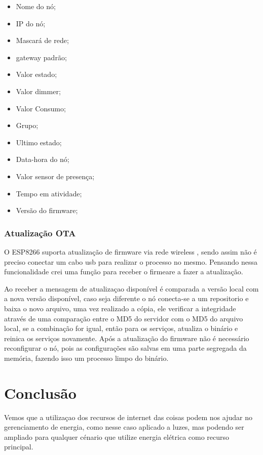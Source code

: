 \documentclass[openright]{normas-utf-tex} %
\begin{document}
\begin{itemize}
    \item Nome do nó;
    \item IP do nó;
    \item Mascará de rede;
    \item gateway padrão;
    \item Valor estado;
    \item Valor dimmer;
    \item Valor Consumo;
    \item Grupo;
    \item Ultimo estado;
    \item Data-hora do nó;
    \item Valor sensor de presença;
    \item Tempo em atividade;
    \item Versão do firmware;
\end{itemize}

\subsection{Atualização OTA}

O ESP8266 suporta atualização de firmware via rede wireless  \cite{espressif}, sendo assim não é preciso conectar um cabo usb para realizar o processo no mesmo. 
Pensando nessa funcionalidade crei uma função para receber o firmeare a fazer a atualização.

Ao receber a mensagem de atualizaçao disponível é comparada a versão local com a nova versão disponível, caso seja diferente o nó conecta-se a um repositorio e baixa o novo arquivo, uma vez realizado a cópia, ele verificar a integridade através de uma comparação entre o MD5 do servidor com o MD5 do arquivo local, se a combinação for igual, então para os serviços, atualiza o binário e reinica os serviços novamente.
Após a atualização do firmware não é necessário reconfigurar o nó, pois as configurações são salvas em uma parte segregada da memória, fazendo isso um processo limpo do binário. 


\chapter{Conclusão}

Vemos que a utilizaçao dos recursos de internet das coisas podem nos ajudar no gerenciamento de energia, como nesse caso aplicado a luzes, mas podendo ser ampliado para qualquer cénario que utilize energia elétrica como recurso principal.
\end{document}
